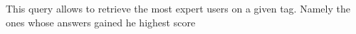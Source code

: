 This query allows to retrieve 
the most expert users on a given tag. Namely the ones whose answers gained he highest score